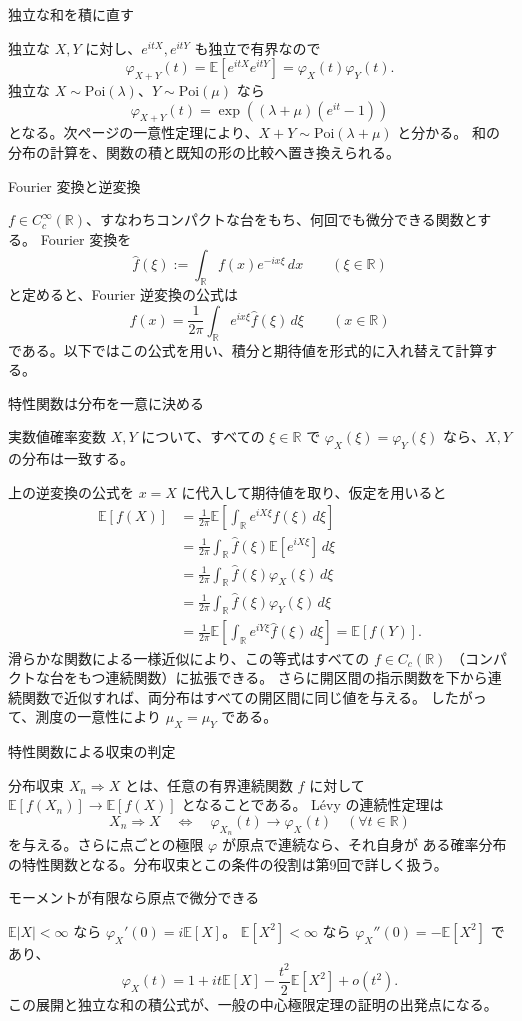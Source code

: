 \documentclass[a4paper,10pt,pdflatex,ja=standard,jafont=ipaex-type1,
  magstyle=real,scale=1]{bxjsarticle}
\newcommand{\topic}[1]{\par\vspace{5pt}
  {\large\sffamily\mdseries\color{accent}#1}\par\vspace{2pt}}
\newcommand{\keybox}[1]{\par\vspace{3pt}\begingroup
  \setlength{\fboxsep}{5pt}
  \colorbox{soft}{\parbox{\dimexpr\linewidth-2\fboxsep\relax}{#1}}%
  \endgroup\par\vspace{2pt}}
\newcommand{\R}{\mathbb R}
\newcommand{\E}{\mathbb E}
\begin{document}
\topic{独立な和を積に直す}
独立な $X,Y$ に対し、$e^{itX},e^{itY}$ も独立で有界なので
$$\varphi_{X+Y}(t)=\E[e^{itX}e^{itY}]
 =\varphi_X(t)\varphi_Y(t).$$
独立な $X\sim\mathrm{Poi}(\lambda)$、$Y\sim\mathrm{Poi}(\mu)$ なら
$$\varphi_{X+Y}(t)=\exp((\lambda+\mu)(e^{it}-1))$$
となる。次ページの一意性定理により、$X+Y\sim\mathrm{Poi}(\lambda+\mu)$ と分かる。
和の分布の計算を、関数の積と既知の形の比較へ置き換えられる。

\newpage
\topic{Fourier 変換と逆変換}
$f\in C_c^\infty(\R)$、すなわちコンパクトな台をもち、何回でも微分できる関数とする。
Fourier 変換を
$$\widehat f(\xi):=\int_\R f(x)e^{-ix\xi}\,dx\qquad(\xi\in\R)$$
と定めると、Fourier 逆変換の公式は
$$f(x)=\frac1{2\pi}\int_\R e^{ix\xi}\widehat f(\xi)\,d\xi
 \qquad(x\in\R)$$
である。以下ではこの公式を用い、積分と期待値を形式的に入れ替えて計算する。

\topic{特性関数は分布を一意に決める}
\keybox{実数値確率変数 $X,Y$ について、すべての $\xi\in\R$ で
$\varphi_X(\xi)=\varphi_Y(\xi)$ なら、$X,Y$ の分布は一致する。}
上の逆変換の公式を $x=X$ に代入して期待値を取り、仮定を用いると
$$
 \begin{aligned}
  \E[f(X)]
   &=\frac1{2\pi}\E\!\left[\int_\R e^{iX\xi}\widehat f(\xi)\,d\xi\right]\\
   &=\frac1{2\pi}\int_\R\widehat f(\xi)\E[e^{iX\xi}]\,d\xi\\
   &=\frac1{2\pi}\int_\R\widehat f(\xi)\varphi_X(\xi)\,d\xi\\
   &=\frac1{2\pi}\int_\R\widehat f(\xi)\varphi_Y(\xi)\,d\xi\\
   &=\frac1{2\pi}\E\!\left[\int_\R e^{iY\xi}\widehat f(\xi)\,d\xi\right]
    =\E[f(Y)].
 \end{aligned}
$$
滑らかな関数による一様近似により、この等式はすべての $f\in C_c(\R)$
（コンパクトな台をもつ連続関数）に拡張できる。
さらに開区間の指示関数を下から連続関数で近似すれば、両分布はすべての開区間に同じ値を与える。
したがって、測度の一意性により $\mu_X=\mu_Y$ である。

\topic{特性関数による収束の判定}
分布収束 $X_n\Rightarrow X$ とは、任意の有界連続関数 $f$ に対して
$\E[f(X_n)]\to\E[f(X)]$ となることである。
L\'evy の連続性定理は
$$X_n\Rightarrow X\quad\Longleftrightarrow\quad
 \varphi_{X_n}(t)\to\varphi_X(t)\quad(\forall t\in\R)$$
を与える。さらに点ごとの極限 $\varphi$ が原点で連続なら、それ自身が
ある確率分布の特性関数となる。分布収束とこの条件の役割は第9回で詳しく扱う。

\topic{モーメントが有限なら原点で微分できる}
$\E|X|<\infty$ なら $\varphi_X'(0)=i\E[X]$。
$\E[X^2]<\infty$ なら $\varphi_X''(0)=-\E[X^2]$ であり、
$$\varphi_X(t)=1+it\E[X]-\frac{t^2}2\E[X^2]+o(t^2).$$
この展開と独立な和の積公式が、一般の中心極限定理の証明の出発点になる。
\end{document}
